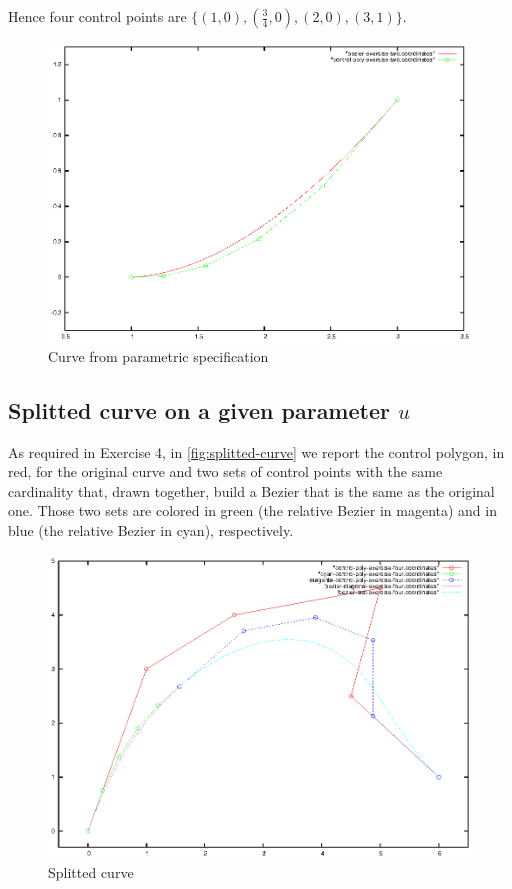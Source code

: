 \documentclass{article}
\begin{document}
Hence four control points are $\{(1,0), (\frac{3}{4},0), (2,0),
(3,1)\}$.
\begin{figure}
  \centering
  \includegraphics{bezier-deCasteljau-curves/exercise-two}
  \caption{Curve from parametric specification}
  \label{fig:curve-from-parametric-spec}
\end{figure}

\subsection{Splitted curve on a given parameter $u$}
As required in Exercise 4, in \autoref{fig:splitted-curve} we report
the control polygon, in red, for the original curve and two sets of
control points with the same cardinality that, drawn together, build a
Bezier that is the same as the original one. Those two sets are
colored in green (the relative Bezier in magenta) and in blue (the
relative Bezier in cyan), respectively.
\begin{figure}[h!]
  \centering
  \includegraphics{bezier-deCasteljau-curves/exercise-four}
  \caption{Splitted curve}
  \label{fig:splitted-curve}
\end{figure}
\end{document}
